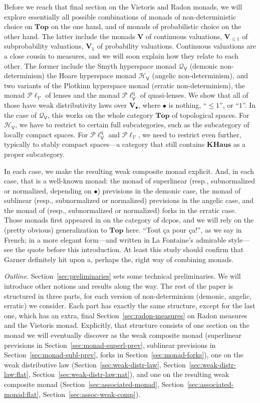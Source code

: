 \documentclass[preprint,12pt]{elsarticle}
\newcommand\Smyth{{\mathcal Q}}
\newcommand\Hoare{{\mathcal H}}
\newcommand\Vt{\mathsf{V}}
\newcommand\HV{\Hoare_\Vt}
\newcommand\SV{\Smyth_{\Vt}}
\newcommand\quasi{\mathrm{q}} %
\newcommand\QL{\Plotkin^\quasi}
\newcommand\QLV{\QL_\Vt}
\newcommand\Plotkin{\mathcal P\ell} %
\newcommand\Plotkinn{\Plotkin_{\mathcal V}}
\newcommand\Val{{\mathbf V}}
\newcommand\Topcat{\mathbf{Top}}
\begin{document}
Before we reach that final section on the Vietoris and Radon monads,
we will explore essentially all possible combinations of monads of
non-deterministic choice on $\Topcat$ on the one hand, and of monads
of probabilistic choice on the other hand.  The latter include the
monads $\Val$ of continuous valuations, $\Val_{\leq 1}$ of
subprobability valuations, $\Val_1$ of probability valuations.
Continuous valuations are a close cousin to measures, and we will soon
explain how they relate to each other.  The former include the Smyth
hyperspace monad $\SV$ (demonic non-determinism) the Hoare hyperspace
monad $\HV$ (angelic non-determinism), and two variants of the
Plotkinn hyperspace monad (erratic non-determinism), the monad
$\Plotkinn$ of lenses and the monad $\QLV$ of quasi-lenses.  We show
that all of those have weak distributivity laws over $\Val_\bullet$,
where $\bullet$ is nothing, ``$\leq 1$'', or ``$1$''.  In the case of
$\SV$, this works on the whole category $\Topcat$ of topological
spaces.  For $\HV$, we have to restrict to certain full subcategories,
such as the subcategory of locally compact spaces.  For $\QLV$ and
$\Plotkinn$, we need to restrict even further, typically to stably
compact spaces---a category that still contains $\mathbf{KHaus}$ as a
proper subcategory.

In each case, we make the resulting weak composite monad explicit.
And, in each case, that is a well-known monad: the monad of
superlinear (resp., subnormalized or normalized, depending on
$\bullet$) previsions in the demonic case, the monad of sublinear
(resp., subnormalized or normalized) previsions in the angelic case,
and the monad of (resp., subnormalized or normalized) forks in the
erratic case.  Those monads first appeared in \cite{Gou-csl07} on the
category of dcpos, and we will rely on the (pretty obvious)
generalization to $\Topcat$ here.  ``Tout \c ca pour \c ca!'', as we
say in French; in a more elegant form---and written in La Fontaine's
admirable style---see the quote before this introduction.  At least
this study should confirm that Garner definitely hit upon a, perhaps
the, right way of combining monads.

\emph{Outline.}  Section~\ref{sec:preliminaries} sets some technical
preliminaries.  We will introduce other notions and results along the
way.  The rest of the paper is structured in three parts, for each
version of non-determinism (demonic, angelic, erratic) we consider.
Each part has exactly the same structure, except for the last one,
which has an extra, final Section~\ref{sec:radon-measures} on Radon
measures and the Vietoris monad.  Explicitly, that structure consists
of one section on the monad we will eventually discover as the weak
composite monad (superlinear previsions in
Section~\ref{sec:monad-superl-prev}, sublinear previsions in
Section~\ref{sec:monad-subl-prev}, forks in
Section~\ref{sec:monad-forks}), one on the weak distributive law
(Section~\ref{sec:weak-distr-law},
Section~\ref{sec:weak-distr-law:flat},
Section~\ref{sec:weak-distr-law:nat}), and one on the resulting weak
composite monad (Section~\ref{sec:associated-monad},
Section~\ref{sec:associated-monad:flat},
Section~\ref{sec:assoc-weak-comp}).
\end{document}
